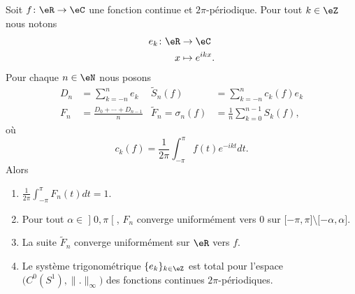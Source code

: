 \begin{theorem}[Fejèr]      \label{ThoJFqczow}
    Soit \( f\colon \eR\to \eC\) une fonction continue et \( 2\pi\)-périodique. Pour tout \( k\in \eZ\) nous notons
    \begin{equation}
        \begin{aligned}
            e_k\colon \eR&\to \eC \\
            x&\mapsto  e^{ikx}.
        \end{aligned}
    \end{equation}
    Pour chaque \( n\in \eN\) nous posons
    \begin{subequations}
        \begin{align}
            D_n&=\sum_{k=-n}^ne_k& \tilde S_n(f)&=\sum_{k=-n}^nc_k(f)e_k\\
            F_n&=\frac{  D_0+\cdots + D_{n-1} }{ n }&  \tilde F_n=\sigma_n(f)&=\frac{1}{ n }\sum_{k=0}^{n-1}S_k(f),
        \end{align}
    \end{subequations}
    où
    \begin{equation}
        c_k(f)=\frac{1}{ 2\pi }\int_{-\pi}^{\pi}f(t) e^{-ikt}dt.
    \end{equation}
    Alors
    \begin{enumerate}
        \item
            $\frac{1}{ 2\pi }\int_{-\pi}^{\pi}F_n(t)dt=1$.
        \item
            Pour tout \( \alpha\in \mathopen] 0 , \pi \mathclose[\), \( F_n\) converge uniformément vers \( 0\) sur \( \mathopen[ -\pi , \pi \mathclose]\setminus\mathopen[ -\alpha , \alpha \mathclose]\).
        \item
            La suite \( \tilde F_n \) converge uniformément sur \( \eR\) vers \( f\).
        \item   \label{ItemUNQSPmyiv}
            Le système trigonométrique \( \{ e_k \}_{k\in\eZ}\) est total pour l'espace \( \big( C^0(S^1),\| . \|_{\infty} \big)\) des fonctions continues \( 2\pi\)-périodiques.
    \end{enumerate}
\end{theorem}

